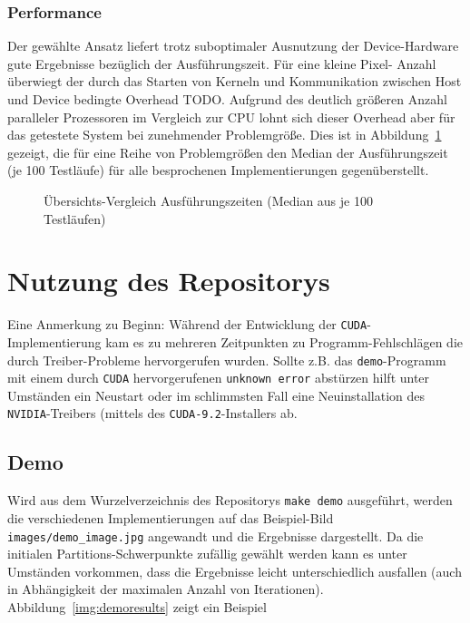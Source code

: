 \documentclass[
    bibliography=totoc, cd=lightcolor, cdmath=false, ngerman]{tudscrreprt}
\begin{document}
\subsection{Performance}

Der gewählte Ansatz liefert trotz suboptimaler Ausnutzung der Device-Hardware
gute Ergebnisse bezüglich der Ausführungszeit. Für eine kleine Pixel- Anzahl
überwiegt der durch das Starten von Kerneln und Kommunikation zwischen Host und
Device bedingte Overhead TODO. Aufgrund des deutlich größeren Anzahl paralleler
Prozessoren im Vergleich zur CPU lohnt sich dieser Overhead aber für das
getestete System bei zunehmender Problemgröße. Dies ist in
Abbildung~\ref{fig:all} gezeigt, die für eine Reihe von Problemgrößen den
Median der Ausführungszeit (je 100 Testläufe) für alle besprochenen
Implementierungen gegenüberstellt.

\begin{figure}[htbp]
  \centering
    
  \caption{Übersichts-Vergleich Ausführungszeiten (Median aus je 100 Testläufen)}
  \label{fig:all}
\end{figure}

\chapter{Nutzung des Repositorys}

Eine Anmerkung zu Beginn: Während der Entwicklung der
\texttt{CUDA}-Implementierung kam es zu mehreren Zeitpunkten zu
Programm-Fehlschlägen die durch Treiber-Probleme hervorgerufen wurden. Sollte
z.B. das \texttt{demo}-Programm mit einem durch \texttt{CUDA} hervorgerufenen
\texttt{unknown error} abstürzen hilft unter Umständen ein Neustart oder im
schlimmsten Fall eine Neuinstallation des \texttt{NVIDIA}-Treibers (mittels des
\texttt{CUDA-9.2}-Installers ab.

\section{Demo}

Wird aus dem Wurzelverzeichnis des Repositorys \texttt{make demo} ausgeführt,
werden die verschiedenen Implementierungen auf das Beispiel-Bild
\texttt{images/demo\_image.jpg} angewandt und die Ergebnisse dargestellt. Da
die initialen Partitions-Schwerpunkte zufällig gewählt werden kann es unter
Umständen vorkommen, dass die Ergebnisse leicht unterschiedlich ausfallen
(auch in Abhängigkeit der maximalen Anzahl von Iterationen).
Abbildung~\ref{img:demoresults} zeigt ein Beispiel
\end{document}
